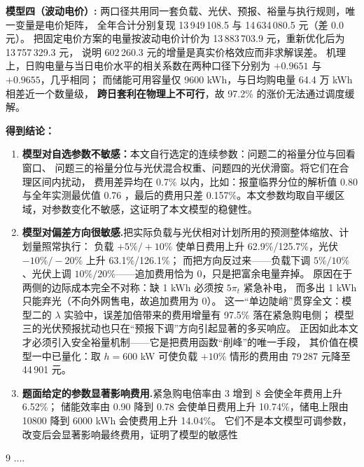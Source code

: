 \documentclass{cumcmthesis}
\begin{document}
    \noindent\textbf{模型四（波动电价）:}
    两口径共用同一套负载、光伏、预报、裕量与执行规则，唯一变量是电价矩阵，
    全年合计分别复现 13\,949\,108.5 与 14\,634\,080.5 元（差 0.0 元）。
    把固定电价方案的电量按波动电价计价为 13\,883\,703.9 元，重新优化后为 13\,757\,329.3 元，
    说明 602\,260.3 元的增量是真实价格效应而非求解误差。
    机理上，日购电量与当日电价水平的相关系数在两种口径下分别为 $+0.9651$ 与 $+0.9655$，几乎相同；
    而储能可用容量仅 9600 kWh，与日均购电量 64.4 万 kWh 相差近一个数量级，
    \textbf{跨日套利在物理上不可行}，故 97.2\% 的涨价无法通过调度缓解。

    \noindent\textbf{得到结论：}
    \begin{enumerate}
     \item \textbf{模型对自选参数不敏感：}本文自行选定的连续参数：问题二的裕量分位与回看窗口、
    问题三的裕量分位与光伏混合权重、问题四的光伏滑窗。将它们在合理区间内扰动，
    费用差异均在 0.7\% 以内，比如：报童临界分位的解析值 0.80 与全年实测最优值 0.76 ，最后的费用只差 0.157\%。本文参数均取自平缓区域，对参数变化不敏感，这证明了本文模型的稳健性。
    \item \textbf{模型对偏差方向很敏感.}把实际负载与光伏相对计划所用的预测整体缩放、计划量照常执行：
    负载 $+5\%/+10\%$ 使单日费用上升 62.9\%/125.7\%，光伏 $-10\%/-20\%$ 上升 63.1\%/126.1\%；
    而把方向反过来——负载下调 $5\%/10\%$、光伏上调 $10\%/20\%$——追加费用恰为 0，只是把富余电量弃掉。
    原因在于两侧的边际成本完全不对称：缺 1 kWh 必须按 $5\pi_t$ 紧急补电，
    而多出 1 kWh 只能弃光（不向外网售电，故追加费用为 0）。
    这一“单边陡峭”贯穿全文：模型二的 $\lambda$ 实验中，误差加倍带来的费用增量有 97.5\% 落在紧急购电侧；
    模型三的光伏预报扰动也只在“预报下调”方向引起显著的多买响应。
    正因如此本文才必须引入安全裕量机制——它是把费用函数“削峰”的唯一手段，
    其价值在模型一中已量化：取 $h=600$ kW 可使负载 $+10\%$ 情形的费用由 79\,287 元降至 44\,901 元。

    \item \textbf{题面给定的参数显著影响费用.}紧急购电倍率由 3 增到 8 会使全年费用上升 6.52\%；
    储能效率由 0.90 降到 0.78 会使单日费用上升 10.74\%，储电上限由 10800 降到 6000 kWh 会使费用上升 14.04\%。
    它们不是本文模型可调参数，改变后会显著影响最终费用，证明了模型的敏感性
    \end{enumerate}
        \begin{thebibliography}{9}%
             ....
        \end{thebibliography}

        \appendix
        \begin{lstlisting}[language=Python]
        \end{lstlisting}
\end{document}
